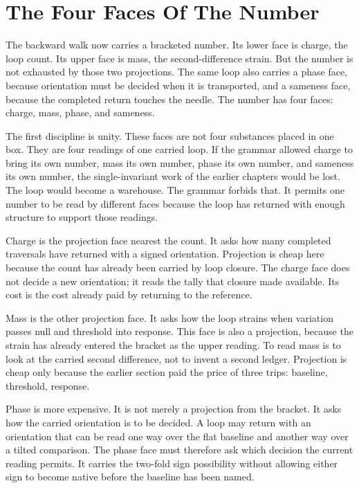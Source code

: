 \section{The Four Faces Of The Number}

The backward walk now carries a bracketed number. Its lower face is charge,
the loop count. Its upper face is mass, the second-difference strain. But the
number is not exhausted by those two projections. The same loop also carries
a phase face, because orientation must be decided when it is transported, and
a sameness face, because the completed return touches the needle. The number
has four faces: charge, mass, phase, and sameness.

The first discipline is unity. These faces are not four substances placed in
one box. They are four readings of one carried loop. If the grammar allowed
charge to bring its own number, mass its own number, phase its own number,
and sameness its own number, the single-invariant work of the earlier
chapters would be lost. The loop would become a warehouse. The grammar
forbids that. It permits one number to be read by different faces because
the loop has returned with enough structure to support those readings.

Charge is the projection face nearest the count. It asks how many completed
traversals have returned with a signed orientation. Projection is cheap here
because the count has already been carried by loop closure. The charge face
does not decide a new orientation; it reads the tally that closure made
available. Its cost is the cost already paid by returning to the reference.

Mass is the other projection face. It asks how the loop strains when
variation passes null and threshold into response. This face is also a
projection, because the strain has already entered the bracket as the upper
reading. To read mass is to look at the carried second difference, not to
invent a second ledger. Projection is cheap only because the earlier section
paid the price of three trips: baseline, threshold, response.

Phase is more expensive. It is not merely a projection from the bracket. It
asks how the carried orientation is to be decided. A loop may return with an
orientation that can be read one way over the flat baseline and another way
over a tilted comparison. The phase face must therefore ask which decision
the current reading permits. It carries the two-fold sign possibility without
allowing either sign to become native before the baseline has been named.

